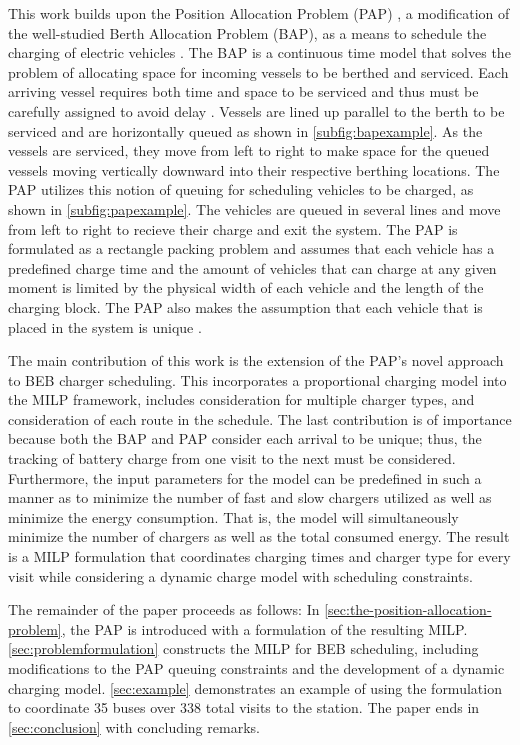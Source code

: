 \documentclass[utf8]{FrontiersinHarvard}
\let\cite\citep                                       %
\newcommand{\EDIT}[1]{{\color{blue}#1}}                                         %
\newcommand{\A}{35 }                                                            %
\newcommand{\N}{338 }                                                           %
\begin{document}
This work builds upon the Position Allocation Problem (PAP) \cite{qarebagh-2019-optim-sched}, a modification of the
well-studied Berth Allocation Problem (BAP), as a means to schedule the charging of electric vehicles
\cite{buhrkal-2011-model-discr,frojan-2015-contin-berth,imai-2001-dynam-berth,rodrigues-2022-berth}. The BAP is a
continuous time model that solves the problem of allocating space for incoming vessels to be berthed and serviced. Each
arriving vessel requires both time and space to be serviced and thus must be carefully assigned to avoid delay
\cite{imai-2001-dynam-berth}. Vessels are lined up parallel to the berth to be serviced and are horizontally queued as
shown in \autoref{subfig:bapexample}. As the vessels are serviced, they move from left to right to make space for the
queued vessels moving vertically downward into their respective berthing locations. The PAP utilizes this notion of
queuing for scheduling vehicles to be charged, as shown in \autoref{subfig:papexample}. The vehicles are queued in
several lines and move from left to right to recieve their charge and exit the system. The PAP is formulated as a
rectangle packing problem and assumes that each vehicle has a predefined charge time \EDIT{and} the amount of
vehicles that can charge at any given moment is limited by the physical width of each vehicle and the length of the
charging block. The PAP also makes the assumption that each vehicle that is placed in the system is unique
\cite{qarebagh-2019-optim-sched}.

The main contribution of this work is the extension of the PAP's novel approach to BEB charger scheduling. This
incorporates a proportional charging model into the MILP framework, includes consideration for multiple charger types,
and consideration of each route in the schedule. The last contribution is of importance because both the BAP and PAP
consider each arrival to be unique; thus, the tracking of battery charge from one visit to the next must be considered.
Furthermore, the input parameters for the model can be predefined in such a manner as to minimize the number of fast and
slow chargers utilized as well as minimize the energy consumption. That is, the model will simultaneously minimize the
number of chargers as well as the total consumed energy. The result is a MILP formulation that coordinates charging
times and charger type for every visit while considering a dynamic charge model with scheduling constraints.

The remainder of the paper proceeds as follows: In \autoref{sec:the-position-allocation-problem}, the PAP is introduced
with a formulation of the resulting MILP. \autoref{sec:problemformulation} constructs the MILP for BEB scheduling,
including modifications to the PAP queuing constraints and the development of a dynamic charging model.
\autoref{sec:example} demonstrates an example of using the formulation to coordinate \A buses over \N total visits to
the station. The paper ends in \autoref{sec:conclusion} with concluding remarks.
\end{document}
